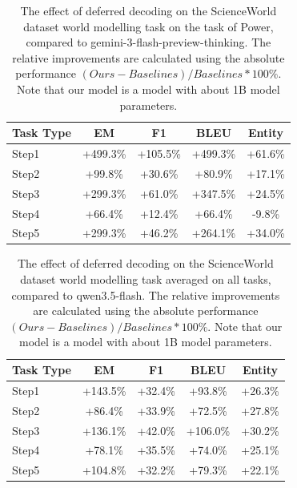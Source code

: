 \begin{table}[h]
\centering
    \setlength\tabcolsep{15pt}
    \setlength\extrarowheight{0pt}
\caption{The effect of deferred decoding on the ScienceWorld dataset \citep{wang-etal-2022-scienceworld} world modelling task on the task of Power, compared to gemini-3-flash-preview-thinking. The relative improvements are calculated using the absolute performance $(Ours - Baselines) / Baselines * 100\%$. Note that our model is a model with about 1B model parameters.}
\label{tab:scienceworld11}
\begin{tabular}{lcccc}
\toprule
\textbf{Task Type} & \textbf{EM} & \textbf{F1}
  & \textbf{BLEU} & \textbf{Entity}\\
\midrule
Step1 & +499.3\% & +105.5\% & +499.3\% & +61.6\% \\
Step2 & +99.8\% & +30.6\% & +80.9\% & +17.1\% \\
Step3 & +299.3\% & +61.0\% & +347.5\% & +24.5\% \\
Step4 & +66.4\% & +12.4\% & +66.4\% & -9.8\% \\
Step5 & +299.3\% & +46.2\% & +264.1\% & +34.0\% \\

\bottomrule
\end{tabular}
\end{table}


\begin{table}[h]
\centering
    \setlength\tabcolsep{15pt}
    \setlength\extrarowheight{0pt}
\caption{The effect of deferred decoding on the ScienceWorld dataset \citep{wang-etal-2022-scienceworld} world modelling task averaged on all tasks, compared to qwen3.5-flash. The relative improvements are calculated using the absolute performance $(Ours - Baselines) / Baselines * 100\%$. Note that our model is a model with about 1B model parameters.}
\label{tab:scienceworld12}
\begin{tabular}{lcccc}
\toprule
\textbf{Task Type} & \textbf{EM} & \textbf{F1}
  & \textbf{BLEU} & \textbf{Entity}\\
\midrule
Step1 & +143.5\% & +32.4\% & +93.8\% & +26.3\% \\
Step2 & +86.4\% & +33.9\% & +72.5\% & +27.8\% \\
Step3 & +136.1\% & +42.0\% & +106.0\% & +30.2\% \\
Step4 & +78.1\% & +35.5\% & +74.0\% & +25.1\% \\
Step5 & +104.8\% & +32.2\% & +79.3\% & +22.1\% \\

\bottomrule
\end{tabular}
\end{table}



